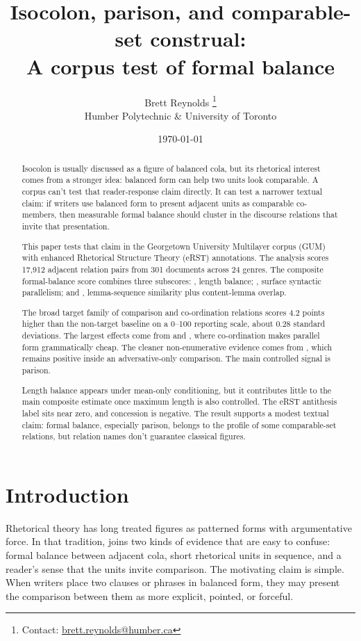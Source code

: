\documentclass[12pt]{article}
\title{Isocolon, parison, and comparable-set construal:\\ A corpus test of formal balance}
\author{Brett Reynolds \orcidlink{0000-0003-0073-7195}%
\thanks{Contact: \href{mailto:brett.reynolds@humber.ca}{brett.reynolds@humber.ca}}\\
Humber Polytechnic \& University of Toronto}
\date{\today}
\begin{document}
\maketitle

\begin{abstract}
Isocolon is usually discussed as a figure of balanced cola, but its
rhetorical interest comes from a stronger idea: balanced form can help two
units look comparable. A corpus can't test that reader-response claim
directly. It can test a narrower textual claim: if writers use balanced
form to present adjacent units as comparable co-members, then measurable
formal balance should cluster in the discourse relations that invite that
presentation.

This paper tests that claim in the Georgetown University Multilayer corpus
(GUM) with enhanced Rhetorical Structure Theory (eRST) annotations. The
analysis scores 17,912 adjacent relation pairs from 301 documents across
24 genres. The composite formal-balance score combines three subscores:
, length balance; , surface syntactic
parallelism; and , lemma-sequence similarity plus
content-lemma overlap.

The broad target family of comparison and co-ordination relations scores
4.2 points higher than the non-target baseline on a 0--100 reporting
scale, about 0.28 standard deviations. The largest effects come from
 and , where co-ordination
makes parallel form grammatically cheap. The cleaner non-enumerative
evidence comes from , which remains positive
inside an adversative-only comparison. The main controlled signal is
parison.

Length balance appears under mean-only conditioning, but it
contributes little to the main composite estimate once maximum length is
also controlled. The eRST antithesis label sits near zero, and concession
is negative. The result supports a modest textual claim: formal balance,
especially parison, belongs to the profile of some comparable-set
relations, but relation names don't guarantee classical figures.
\end{abstract}

\section{Introduction}

Rhetorical theory has long treated figures as patterned forms with
argumentative force. In that tradition,
 joins two kinds of evidence that are easy to confuse:
formal balance between adjacent cola, short rhetorical units in sequence,
and a reader's sense that the units
invite comparison. The motivating claim is simple. When writers place two
clauses or phrases in balanced form, they may present the comparison
between them as more explicit, pointed, or forceful.
\end{document}

